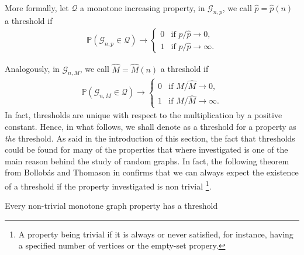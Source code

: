 More formally, let $\mathcal{Q}$ a monotone increasing property,  in $\mathcal{G}_{n, p}$, we call $\hat{p} = \hat{p}(n)$ a threshold if
\begin{align}
	\mathbb{P}(\mathcal{G}_{n,p} \in \mathcal{Q}) \rightarrow \left\{\begin{array}{rl}
										0 & \text{if } p / \hat{p} \to 0,\\
										1 & \text{if } p / \hat{p} \to \infty.
									 \end{array}
									\right.
\end{align}

Analogously, in $\mathcal{G}_{n, M}$, we call $\hat{M} = \hat{M}(n)$ a threshold if
\begin{align}
	\mathbb{P}(\mathcal{G}_{n,M} \in \mathcal{Q}) \rightarrow \left\{\begin{array}{rl}
										0 & \text{if } M / \hat{M} \to 0,\\
										1 & \text{if } M / \hat{M} \to \infty.
									 \end{array}
									\right.
\end{align}
In fact, thresholds are unique with respect to the multiplication by a positive constant. Hence, in what follows, we shall denote as a threshold for a property as \emph{the} threshold.
\newline
As said in the introduction of this section, the fact that thresholds could be found for many of the properties that where investigated is one of the main reason behind the study of random graphs.
In fact, the following theorem from Bollob\'as and Thomason in \cite{Bollob87} confirms that we can always expect the existence of a threshold if the property investigated is non trivial
\footnote{A property being trivial if it is always or never satisfied, for instance, having a specified number of vertices or the empty-set propery.}.
\begin{theorem}
	Every non-trivial monotone graph property has a threshold
\end{theorem}
